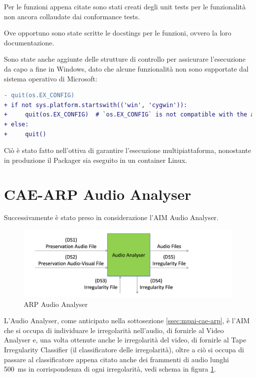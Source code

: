Per le funzioni appena citate sono stati creati degli unit tests per le funzionalità non ancora collaudate dai conformance tests.

Ove opportuno sono state scritte le docstings per le funzioni, ovvero la loro documentazione.

Sono state anche aggiunte delle strutture di controllo per assicurare l'esecuzione da capo a fine in Windows, dato che alcune funzionalità non sono supportate dal sistema operativo di Microsoft:
\begin{lstlisting}[language=diff]
- quit(os.EX_CONFIG)
+ if not sys.platform.startswith(('win', 'cygwin')):
+     quit(os.EX_CONFIG)  # `os.EX_CONFIG` is not compatible with the above platforms in Python 3.10
+ else:
+     quit()
\end{lstlisting}
Ciò è stato fatto nell'ottiva di garantire l'esecuzione multipiattaforma, nonostante in produzione il Packager sia eseguito in un container Linux.


\section{\acs{CAE}-\acs{ARP} Audio Analyser} \label{sec:test-audioanalyser}
Successivamente è stato preso in considerazione l'\ac{AIM} Audio Analyser.

\begin{figure}[H]
    \centering
    \includegraphics{img/audioanalyser.png}
    \caption{\ac{ARP} Audio Analyser}
    \label{fig:audio-analyser}
\end{figure}

L'Audio Analyser, come anticipato nella sottosezione \ref{ssec:mpai-cae-arp}, è l'\ac{AIM} che si occupa di individuare le irregolarità nell'audio, di fornirle al Video Analyser e, una volta ottenute anche le irregolarità del video, di fornirle al Tape Irregularity Classifier (il classificatore delle irregolarità), oltre a ciò si occupa di passare al classificatore appena citato anche dei frammenti di audio lunghi \qty{500}{\ms} in corrispondenza di ogni irregolarità, vedi schema in figura \ref{fig:audio-analyser}.

